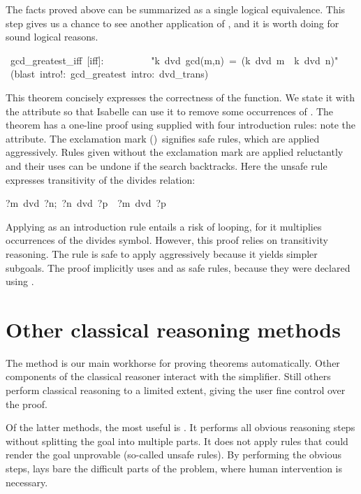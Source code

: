 The facts proved above can be summarized as a single logical 
equivalence.  This step gives us a chance to see another application
of , and it is worth doing for sound logical reasons.
\begin{isabelle}
\ gcd_greatest_iff\ [iff]:\isanewline
\ \ \ \ \ \ \ \ \ "k\ dvd\ gcd(m,n)\ =\ (k\ dvd\ m\ \isasymand\ k\ dvd\ n)"\isanewline
{}\ (blast\ intro!:\ gcd_greatest\ intro:\ dvd_trans)\isanewline
{}
\end{isabelle}
This theorem concisely expresses the correctness of the {} 
function. 
We state it with the {} attribute so that 
Isabelle can use it to remove some occurrences of {}. 
The theorem has a one-line 
proof using {} supplied with four introduction 
rules: note the {} attribute. The exclamation mark 
({}{\isa{!}})\ signifies safe rules, which are 
applied aggressively.  Rules given without the exclamation mark 
are applied reluctantly and their uses can be undone if 
the search backtracks.  Here the unsafe rule expresses transitivity  
of the divides relation:
\begin{isabelle}
\isasymlbrakk?m\ dvd\ ?n;\ ?n\ dvd\ ?p\isasymrbrakk\ \isasymLongrightarrow\ ?m\ dvd\ ?p%
\end{isabelle}
Applying  as 
an introduction rule entails a risk of looping, for it multiplies 
occurrences of the divides symbol. However, this proof relies 
on transitivity reasoning.  The rule {} is safe to apply 
aggressively because it yields simpler subgoals.  The proof implicitly
uses  and  as safe rules, because they were
declared using .


\section{Other classical reasoning methods}
 
The {} method is our main workhorse for proving theorems 
automatically. Other components of the classical reasoner interact 
with the simplifier. Still others perform classical reasoning 
to a limited extent, giving the user fine control over the proof. 

Of the latter methods, the most useful is {}. It performs 
all obvious reasoning steps without splitting the goal into multiple 
parts. It does not apply rules that could render the 
goal unprovable (so-called unsafe rules). By performing the obvious 
steps, {} lays bare the difficult parts of the problem, 
where human intervention is necessary. 

